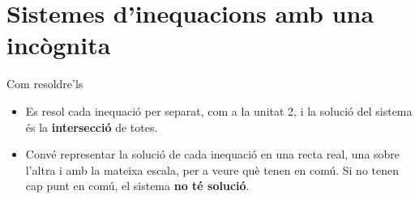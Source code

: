 \documentclass[11pt,a4paper]{article}
\begin{document}
\section{Sistemes d'inequacions amb una incògnita}\hypertarget{sec3}{}
\begin{fmprop}{Com resoldre'ls}
\begin{itemize}
\item Es resol cada inequació per separat, com a la unitat 2, i la solució del sistema és la \textbf{intersecció} de totes.
\item Convé representar la solució de cada inequació en una recta real, una sobre l'altra i amb la mateixa escala, per a veure què tenen en comú. Si no tenen cap punt en comú, el sistema \textbf{no té solució}.
\end{itemize}
\end{fmprop}
\end{document}

